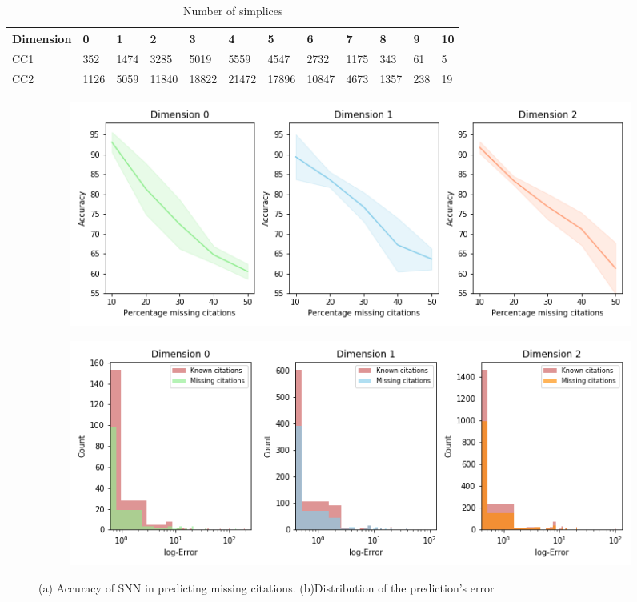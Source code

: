 \begin{table}[htbp]
  \caption{%
  Number of simplices
  }
  \label{table:Simplices-coauthor}
  \centering
  \scriptsize{
  \begin{tabular}{llllllllllll}
    \cmidrule(r){1-12}
    Dimension   & 0     & 1  & 2     & 3 & 4     & 5 & 6    & 7 & 8   & 9 & 10\\
    \midrule
    CC1 & 352  & 1474  & 3285  & 5019  & 5559  & 4547  & 2732  & 1175  & 343 & 61 & 5\\
    CC2 & 1126 & 5059 & 11840 & 18822 & 21472 & 17896  & 10847 & 4673 & 1357 & 238 & 19\\ 
    \bottomrule
  \end{tabular}}
\end{table}
\begin{figure}[tb]
\centering
 \begin{subfigure}[t]{-0.8\textwidth}
 \vspace{-4cm}
  \end{subfigure}
\begin{subfigure}[t]{0.8\textwidth}
\centering
   \includegraphics[scale=0.4]{./figures/accuracy_network1.png}
\end{subfigure}
 \begin{subfigure}[t]{0.8\textwidth}
  \end{subfigure}
\begin{subfigure}[t]{0.8\textwidth}
\centering
\vspace{-0.5cm}
   \includegraphics[scale=0.41]{./figures/Error_dist_start150250_seed6666_notsee40.png}
\end{subfigure}
\caption{(a) Accuracy of SNN in predicting missing citations. (b)Distribution of the prediction's error}
\label{fig:accuracy-error}
\end{figure}
